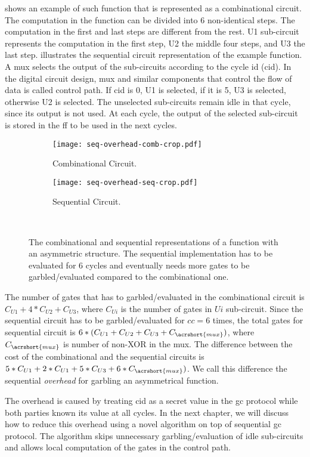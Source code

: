  shows an example of such function that is represented as a combinational circuit.
The computation in the function can be divided into 6 non-identical steps.
The computation in the first and last steps are different from the rest.
U1 sub-circuit represents the computation in the first step, U2 the middle four steps, and U3 the last step.
 illustrates the sequential circuit representation of the example function.
A \acrshort{mux} selects the output of the sub-circuits according to the cycle id (cid).
In the digital circuit design, \acrshort{mux} and similar components that control the flow of data is called control path.
If cid is 0, U1 is selected, if it is 5, U3 is selected, otherwise U2 is selected.
The unselected sub-circuits remain idle in that cycle, since its output is not used.
At each cycle, the output of the selected sub-circuit is stored in the \acrshort{ff} to be used in the next cycles.

\begin{figure}
    \centering
    \begin{subfigure}[t]{0.7\textwidth}
        \texttt{[image: seq-overhead-comb-crop.pdf]}
        \caption{Combinational Circuit.}\label{fig:seq-overhead-comb}
    \end{subfigure}
    \begin{subfigure}[t]{0.6\textwidth}
        \texttt{[image: seq-overhead-seq-crop.pdf]}
        \caption{Sequential Circuit.}\label{fig:seq-overhead-seq}
    \end{subfigure}\\
    \caption{The combinational and sequential representations of a function with an asymmetric structure.
    The sequential implementation has to be evaluated for 6 cycles and eventually needs more gates to be garbled/evaluated compared to the combinational one.}\label{fig:fig:seq-overhead-comb}
\end{figure}

The number of gates that has to garbled/evaluated in the combinational circuit is $C_{U1}+4*C_{U2}+C_{U3}$, where $C_{Ui}$ is the number of gates in $Ui$ sub-circuit.
Since the sequential circuit has to be garbled/evaluated for $cc=6$ times, the total gates for sequential circuit is $6*(C_{U1}+C_{U2}+C_{U3}+C_{\acrshort{mux}})$, where $C_{\acrshort{mux}}$ is number of non-XOR in the \acrshort{mux}.
The difference between the cost of the combinational and the sequential circuits is $5*C_{U1}+2*C_{U1}+5*C_{U3}+6*C_{\acrshort{mux}})$.
We call this difference the sequential \textit{overhead} for garbling an asymmetrical function.

The overhead is caused by treating cid as a secret value in the \acrshort{gc} protocol while both parties known its value at all cycles.
In the next chapter, we will discuss how to reduce this overhead using a novel algorithm on top of sequential \acrshort{gc} protocol.
The algorithm skips unnecessary garbling/evaluation of idle sub-circuits and allows local computation of the gates in the control path.
